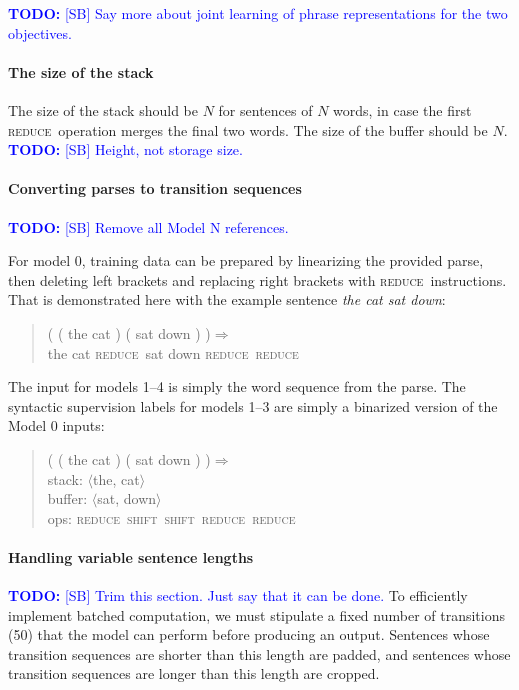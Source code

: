 \documentclass[11pt]{article}
\newcommand\todo[1]{\textcolor{blue}{\textbf{TODO:} #1}}
\newcommand{\shift}{\textsc{shift}}
\newcommand{\reduce}{\textsc{reduce}}
\def\ii#1{\textit{#1}}
\begin{document}
\todo{[SB] Say more about joint learning of phrase representations for the two objectives.}

\paragraph{The size of the stack}
The size of the stack should be $N$ for sentences of $N$ words, in case the first \reduce~operation merges the final two words. The size of the buffer should be $N$. \todo{[SB] Height, not storage size.}

\paragraph{Converting parses to transition sequences}
\todo{[SB] Remove all Model N references.}

For model 0, training data can be prepared by linearizing the provided parse, then deleting left brackets and replacing right brackets with \reduce~instructions. That is demonstrated here with the example sentence \ii{the cat sat down}:

\begin{quote}\small
( ( the cat ) ( sat down ) )$\Rightarrow$\\
the cat \reduce~sat down \reduce~\reduce
\end{quote}

The input for models 1--4 is simply the word sequence from the parse. The syntactic supervision labels for models 1--3 are simply a binarized version of the Model 0 inputs:

\begin{quote}\small
( ( the cat ) ( sat down ) )$\Rightarrow$ \\
stack: $\langle$the, cat$\rangle$\\
buffer: $\langle$sat, down$\rangle$\\
ops: \reduce~\shift~\shift~\reduce~\reduce
\end{quote}

\paragraph{Handling variable sentence lengths}

\todo{[SB] Trim this section. Just say that it can be done.}
To efficiently implement batched computation, we must stipulate a fixed number of transitions (50) that the model can perform before producing an output. Sentences whose transition sequences are shorter than this length are padded, and sentences whose transition sequences are longer than this length are cropped. 
\end{document}
